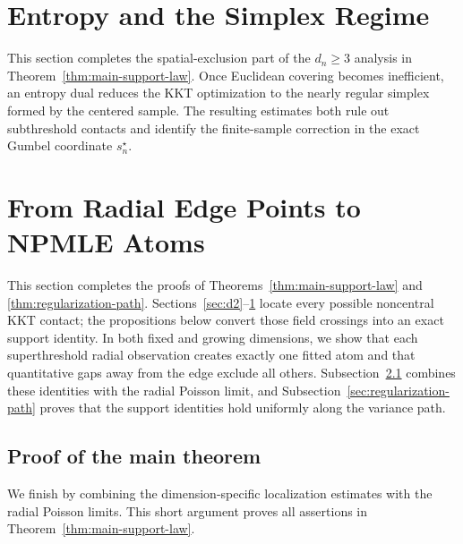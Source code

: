 \documentclass[11pt]{article}
\theoremstyle{remark}
\numberwithin{equation}{section}
\begin{document}






\section{Entropy and the Simplex Regime}
\label{sec:simplex}

This section completes the spatial-exclusion part of the
\(d_n\ge3\) analysis in Theorem~\ref{thm:main-support-law}. Once Euclidean
covering becomes inefficient, an entropy dual reduces the KKT optimization to
the nearly regular simplex formed by the centered sample. The resulting
estimates both rule out subthreshold contacts and identify the finite-sample
correction in the exact Gumbel coordinate \(s_n^\star\).



\section{From Radial Edge Points to NPMLE Atoms}
\label{sec:support}

This section completes the proofs of Theorems~\ref{thm:main-support-law} and
\ref{thm:regularization-path}. Sections~\ref{sec:d2}--\ref{sec:simplex}
locate every possible noncentral KKT contact; the propositions below convert
those field crossings into an exact support identity. In both fixed and
growing dimensions, we show that each superthreshold radial observation
creates exactly one fitted atom and that quantitative gaps away from the edge
exclude all others. Subsection~\ref{sec:edge-count-reduction} combines these
identities with the radial Poisson limit, and
Subsection~\ref{sec:regularization-path} proves that the support identities
hold uniformly along the variance path.





\subsection{Proof of the main theorem}
\label{sec:edge-count-reduction}

We finish by combining the dimension-specific localization estimates with
the radial Poisson limits. This short argument proves all assertions in
Theorem~\ref{thm:main-support-law}.





\small


\end{document}
